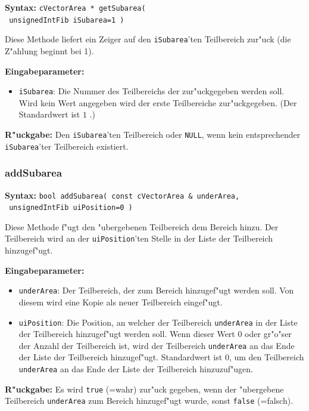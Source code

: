 \textbf{Syntax:} \verb|cVectorArea * getSubarea(| \\\verb| unsignedIntFib iSubarea=1 )|

\bigskip\noindent
Diese Methode liefert ein Zeiger auf den \verb|iSubarea|'ten Teilbereich zur"uck (die Z"ahlung beginnt bei 1).

\bigskip\noindent
\textbf{Eingabeparameter:}
\begin{itemize}
 \item \verb|iSubarea|: Die Nummer des Teilbereichs der zur"uckgegeben werden soll. Wird kein Wert angegeben wird der erste Teilbereiche zur"uckgegeben. (Der Standardwert ist $1$ .)
\end{itemize}

\bigskip\noindent
\textbf{R"uckgabe:} Den \verb|iSubarea|'ten Teilbereich oder \verb|NULL|, wenn kein entsprechender \verb|iSubarea|'ter Teilbereich existiert.


\subsubsection{addSubarea}

\textbf{Syntax:} \verb|bool addSubarea( const cVectorArea & underArea,| \\\verb| unsignedIntFib uiPosition=0 )|

\bigskip\noindent
Diese Methode f"ugt den "ubergebenen Teilbereich dem Bereich hinzu. Der Teilbereich wird an der \verb|uiPosition|'ten Stelle in der Liste der Teilbereich hinzugef"ugt.

\bigskip\noindent
\textbf{Eingabeparameter:}
\begin{itemize}
 \item \verb|underArea|: Der Teilbereich, der zum Bereich hinzugef"ugt werden soll. Von diesem wird eine Kopie als neuer Teilbereich eingef"ugt.
 \item \verb|uiPosition|: Die Position, an welcher der Teilbereich \verb|underArea| in der Liste der Teilbereich hinzugef"ugt werden soll. Wenn dieser Wert $0$ oder gr"o"ser der Anzahl der Teilbereich ist, wird der Teilbereich \verb|underArea| an das Ende der Liste der Teilbereich hinzugef"ugt. Standardwert ist $0$, um den Teilbereich \verb|underArea| an das Ende der Liste der Teilbereich hinzuzuf"ugen.
\end{itemize}

\bigskip\noindent
\textbf{R"uckgabe:} Es wird \verb|true| (=wahr) zur"uck gegeben, wenn der "ubergebene Teilbereich \verb|underArea| zum Bereich hinzugef"ugt wurde, sonst \verb|false| (=falsch).


